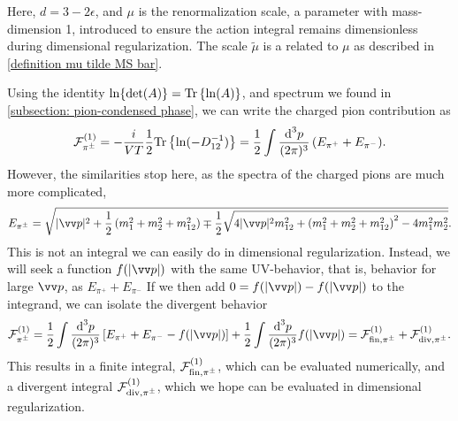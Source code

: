 %
Here, $d = 3 - 2\epsilon$, and $\mu$ is the renormalization scale, a parameter with mass-dimension 1, introduced to ensure the action integral remains dimensionless during dimensional regularization. The scale $\tilde \mu$ is a related to $\mu$ as described in \autoref{definition mu tilde MS bar}.

Using the identity $\ln\{\det(A)\} = \text{Tr} \left\{ \ln(A) \right\}$, and spectrum we found in \autoref{subsection: pion-condensed phase}, we can write the charged pion contribution as
%
\begin{equation}
    \mathcal{F}_{\pi^\pm}^{(1)}
    = - \frac{i}{VT}\frac{1}{2}\text{Tr} \left\{ \ln(-D_{12}^{-1}) \right\}
    =
    \frac{1}{2} \int  \frac{\text{d}^3 p}{(2\pi)^3 } \, (E_{\pi^+} + E_{\pi^-}).
\end{equation}
%
However, the similarities stop here, as the spectra of the charged pions are much more complicated,
%
\begin{equation}
    E_{\pi^\pm}
    = 
    \sqrt{
        |\vv p|^2 +
        \frac{1}{2}
        \left(
            m_1^2 + m_2^2 + m_{12}^2 
        \right)
        \mp 
        \frac{1}{2}
        \sqrt{
            4|\vv p|^2m_{12}^2 
            +
            \left(
                m_1^2 + m_2^2 + m_{12}^2
            \right)^2
            - 4 m_1^2 m_2^2
        }
    }.
\end{equation}
%
This is not an integral we can easily do in dimensional regularization.
Instead, we will seek a function $f(|\vv p|)$ with the same UV-behavior, that is, behavior for large $\vv p$, as $E_{\pi^+} + E_{\pi^-}$
If we then add $0 = f(|\vv p|) - f(|\vv p|)$ to the integrand, we can isolate the divergent behavior
%
\begin{equation}
    \Eff_{\pi^\pm}^{(1)}
    = 
    \frac{1}{2} \int \frac{\dd^3 p}{(2\pi)^3} 
    \left[E_{\pi^+} + E_{\pi^- } - f(|\vv p|)\right]
    + \frac{1}{2} \int \frac{\dd^3 p}{(2\pi)^3} f(|\vv p|)
    = \Eff^{(1)}_{\mathrm{fin}, \pipm } + \Eff^{(1)}_{\mathrm{div}, \pipm}.
\end{equation}
%
This results in a finite integral, $\mathcal{F}^{(1)}_{\mathrm{fin}, {\pi^\pm} }$, which can be evaluated numerically, and a divergent integral $\mathcal{F}^{(1)}_{\mathrm{div}, {\pi^\pm} }$, which we hope can be evaluated in dimensional regularization.

